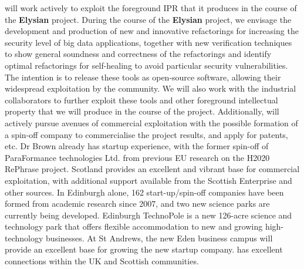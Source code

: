 \documentclass[a4paper,11pt]{article}
\newcommand{\project}[1]{\textbf{#1}\xspace}
\newcommand{\SECURITY}{\project{Elysian}}
\newcommand{\TheProject}{\SECURITY}
\begin{document}
\SAshort{} will work actively to exploit the foreground IPR that it produces in the course of the \TheProject{} project. During the course of the \TheProject{} project, we envisage the development and production of new and innovative refactorings for increasing the security level of big data applications, together with new verification techniques to show general soundness and correctness of the refactorings and identify optimal refactorings for self-healing to avoid particular security vulnerabilities. The intention is to release these tools as open-source software, allowing their widespread exploitation by the community. We will also work with the industrial collaborators to further exploit these tools and other foreground intellectual property that we will produce in the course of the project. 
Additionally, \SAshort{} will actively pursue avenues of commercial exploitation with the possible formation of a spin-off company to commercialise the project results, and apply for patents, etc. Dr Brown already has startup experience, with the former spin-off of ParaFormance technologies Ltd. from previous EU research on the H2020 RePhrase project. Scotland provides an excellent and vibrant base for commercial exploitation, with additional support available from the Scottish Enterprise and other sources.  In Edinburgh alone, 162 start-up/spin-off companies have been formed from academic research since 2007, and two new science parks are currently being developed. Edinburgh TechnoPole is a new 126-acre science and technology park that offers flexible accommodation to new and growing high-technology businesses. At St Andrews, the new Eden business campus will provide an excellent base for growing the new startup company. \SA has excellent connections within the UK and Scottish communities.
\end{document}
